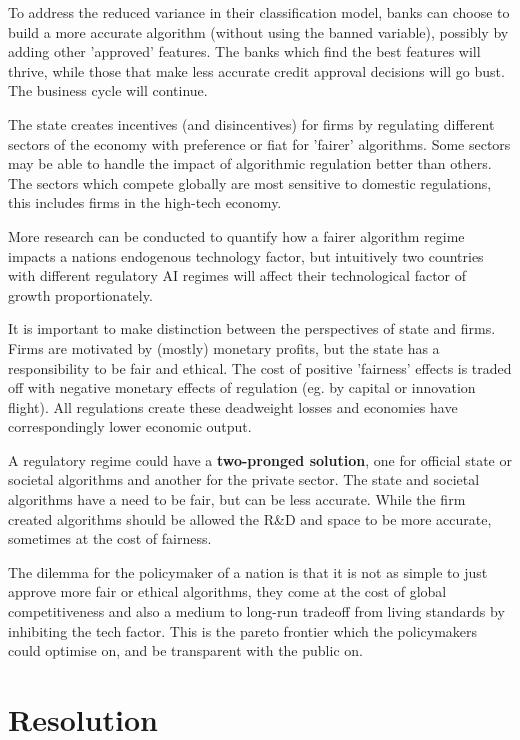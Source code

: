 \documentclass[11pt]{article}
\begin{document}
To address the reduced variance in their classification model, banks can choose to build a more accurate algorithm (without using the banned variable), possibly by adding other 'approved' features. The banks which find the best features will thrive, while those that make less accurate credit approval decisions will go bust. The business cycle will continue.

The state creates incentives (and disincentives) for firms by regulating different sectors of the economy with preference or fiat for 'fairer' algorithms. Some sectors may be able to handle the impact of algorithmic regulation better than others. The sectors which compete globally are most sensitive to domestic regulations, this includes firms in the high-tech economy.

More research can be conducted to quantify how a fairer algorithm regime impacts a nations endogenous technology factor, but intuitively two countries with different regulatory AI regimes will affect their technological factor of growth proportionately. 

It is important to make distinction between the perspectives of state and firms. Firms are motivated by (mostly) monetary profits, but the state has a responsibility to be fair and ethical. The cost of positive 'fairness' effects is traded off with negative monetary effects of regulation (eg. by capital or innovation flight). All regulations create these deadweight losses and economies have correspondingly lower economic output. 

A regulatory regime could have a \textbf{two-pronged solution}, one for official state or societal algorithms and another for the private sector. The state and societal algorithms have a need to be fair, but can be less accurate. While the firm created algorithms should be allowed the R\&D and space to be more accurate, sometimes at the cost of fairness.

The dilemma for the policymaker of a nation is that it is not as simple to just approve more fair or ethical algorithms, they come at the cost of global competitiveness and also a medium to long-run tradeoff from living standards by inhibiting the tech factor. This is the pareto frontier which the policymakers could optimise on, and be transparent with the public on.

\section{Resolution}
\end{document}
